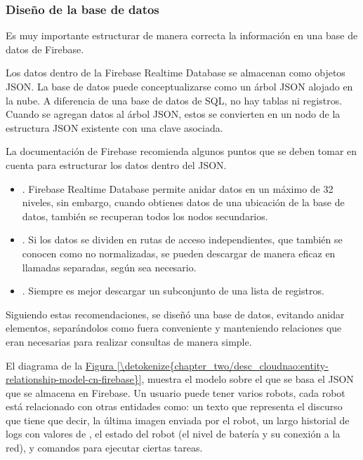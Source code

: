 \subsubsection{Diseño de la base de datos}
\label{\detokenize{chapter_two/desc_cloudnao:diseno-de-la-base-de-datos}}
Es muy importante estructurar de manera correcta la información en una base
de datos de Firebase.

Los datos dentro de la Firebase Realtime Database se almacenan como objetos
JSON. La base de datos puede conceptualizarse como un árbol JSON alojado en la
nube. A diferencia de una base de datos de SQL, no hay tablas ni registros.
Cuando se agregan datos al árbol JSON, estos se convierten en un nodo de la
estructura JSON existente con una clave asociada.

La documentación de Firebase recomienda algunos puntos que se deben tomar
en cuenta para estructurar los datos dentro del JSON.
\begin{itemize}
\item {} 
. Firebase Realtime Database permite anidar datos en un máximo de 32 niveles, sin embargo, cuando obtienes datos de una ubicación de la base de datos, también se recuperan todos los nodos secundarios.

\item {} 
. Si los datos se dividen en rutas de acceso independientes, que también se conocen como no normalizadas, se pueden descargar de manera eficaz en llamadas separadas, según sea necesario.

\item {} 
. Siempre es mejor descargar un subconjunto de una lista de registros.

\end{itemize}

Siguiendo estas recomendaciones, se diseñó una base de datos, evitando anidar
elementos, separándolos como fuera conveniente y manteniendo relaciones que
eran necesarias para realizar consultas de manera simple.

El diagrama de la \hyperref[\detokenize{chapter_two/desc_cloudnao:entity-relationship-model-cn-firebase}]{Figura \ref{\detokenize{chapter_two/desc_cloudnao:entity-relationship-model-cn-firebase}}}, muestra el
modelo sobre el que se basa el JSON que se almacena en Firebase.
Un usuario puede tener varios robots, cada robot está relacionado
con otras entidades como: un texto que representa el discurso que tiene que decir,
la última imagen enviada por el robot, un largo historial de
logs con valores de , el estado del robot (el nivel de batería y
su conexión a la red), y comandos para ejecutar ciertas tareas.

